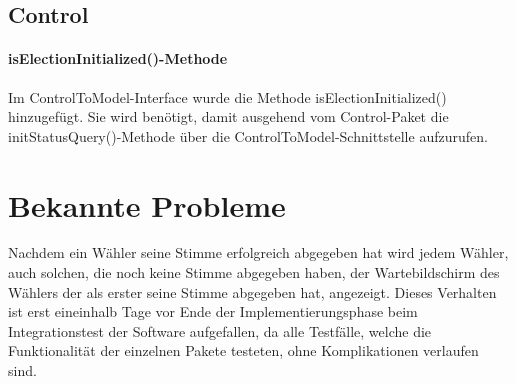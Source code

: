 \documentclass[parskip=full]{scrartcl}
\begin{document}
\subsection{Control}
\paragraph{isElectionInitialized()-Methode}
Im ControlToModel-Interface wurde die Methode isElectionInitialized() hinzugefügt. Sie wird benötigt, damit ausgehend vom Control-Paket die initStatusQuery()-Methode über die ControlToModel-Schnittstelle aufzurufen.

\section{Bekannte Probleme} 
\label{sect:problem}
Nachdem ein Wähler seine Stimme erfolgreich abgegeben hat wird jedem Wähler, auch solchen, die noch keine Stimme abgegeben haben, der Wartebildschirm des Wählers der als erster seine Stimme abgegeben hat, angezeigt.
Dieses Verhalten ist erst eineinhalb Tage vor Ende der Implementierungsphase beim Integrationstest der Software aufgefallen, da alle Testfälle, welche die Funktionalität der einzelnen Pakete testeten, ohne Komplikationen verlaufen sind.
\end{document}
